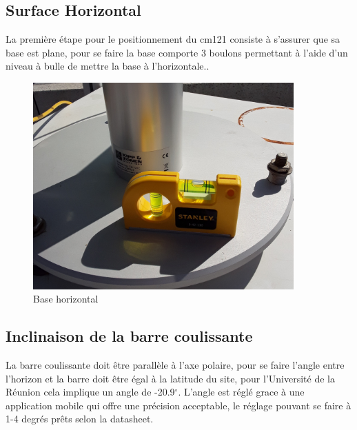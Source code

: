 \documentclass[12pt,a4paper]{article}
\begin{document}
\begin{flushleft}
\subsection{Surface Horizontal}

La première étape pour le positionnement du cm121 consiste à s'assurer que sa base est plane, pour se faire la base comporte 3 boulons permettant à l'aide d'un niveau à bulle de mettre la base à l'horizontale.. 

\begin{figure}[H]
\centering
\includegraphics[width=10cm]{image/montage/2.jpg} 
\caption{Base horizontal}
\end{figure}

\subsection{Inclinaison de la barre coulissante}

La barre coulissante doit être parallèle à l'axe polaire, pour se faire l'angle entre l'horizon et la barre doit être égal à la latitude du site, pour l'Université de la Réunion cela implique un angle de -20.9$^\circ$. L'angle est réglé grace à une application mobile qui offre une précision acceptable, le réglage pouvant se faire à 1-4 degrés prêts selon la datasheet.


\end{flushleft}
\end{document}
